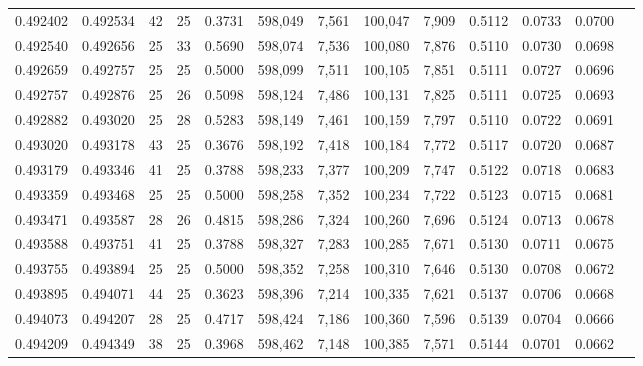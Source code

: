 \begin{tabular}{rrrrrrrrrrrrr}
0.492402 & 0.492534 &    42 &  25 &                                     0.3731 & 598,049 &   7,561 & 100,047 &   7,909 & 0.5112 & 0.0733 & 0.0700 \\
0.492540 & 0.492656 &    25 &  33 &                                     0.5690 & 598,074 &   7,536 & 100,080 &   7,876 & 0.5110 & 0.0730 & 0.0698 \\
0.492659 & 0.492757 &    25 &  25 &                                     0.5000 & 598,099 &   7,511 & 100,105 &   7,851 & 0.5111 & 0.0727 & 0.0696 \\
0.492757 & 0.492876 &    25 &  26 &                                     0.5098 & 598,124 &   7,486 & 100,131 &   7,825 & 0.5111 & 0.0725 & 0.0693 \\
0.492882 & 0.493020 &    25 &  28 &                                     0.5283 & 598,149 &   7,461 & 100,159 &   7,797 & 0.5110 & 0.0722 & 0.0691 \\
0.493020 & 0.493178 &    43 &  25 &                                     0.3676 & 598,192 &   7,418 & 100,184 &   7,772 & 0.5117 & 0.0720 & 0.0687 \\
0.493179 & 0.493346 &    41 &  25 &                                     0.3788 & 598,233 &   7,377 & 100,209 &   7,747 & 0.5122 & 0.0718 & 0.0683 \\
0.493359 & 0.493468 &    25 &  25 &                                     0.5000 & 598,258 &   7,352 & 100,234 &   7,722 & 0.5123 & 0.0715 & 0.0681 \\
0.493471 & 0.493587 &    28 &  26 &                                     0.4815 & 598,286 &   7,324 & 100,260 &   7,696 & 0.5124 & 0.0713 & 0.0678 \\
0.493588 & 0.493751 &    41 &  25 &                                     0.3788 & 598,327 &   7,283 & 100,285 &   7,671 & 0.5130 & 0.0711 & 0.0675 \\
0.493755 & 0.493894 &    25 &  25 &                                     0.5000 & 598,352 &   7,258 & 100,310 &   7,646 & 0.5130 & 0.0708 & 0.0672 \\
0.493895 & 0.494071 &    44 &  25 &                                     0.3623 & 598,396 &   7,214 & 100,335 &   7,621 & 0.5137 & 0.0706 & 0.0668 \\
0.494073 & 0.494207 &    28 &  25 &                                     0.4717 & 598,424 &   7,186 & 100,360 &   7,596 & 0.5139 & 0.0704 & 0.0666 \\
0.494209 & 0.494349 &    38 &  25 &                                     0.3968 & 598,462 &   7,148 & 100,385 &   7,571 & 0.5144 & 0.0701 & 0.0662 \\

\end{tabular}
